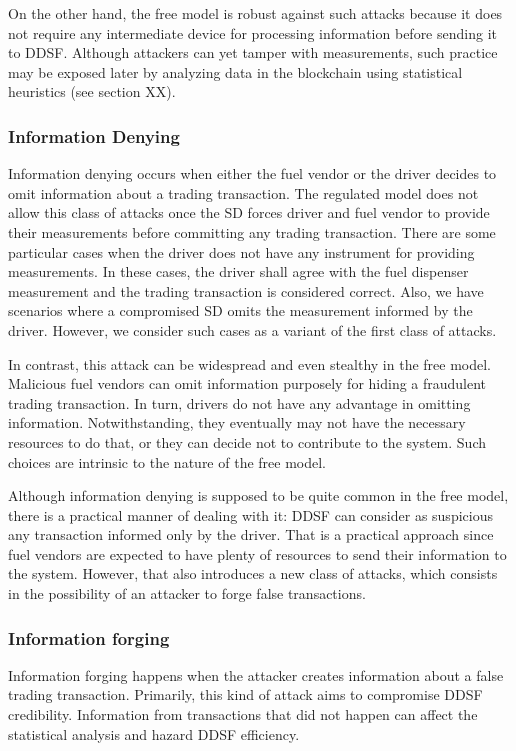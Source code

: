 \documentclass[sigplan]{acmart}
\begin{document}
On the other hand, the free model is robust against such attacks because it does not require any intermediate device for processing information before sending it to DDSF.
Although attackers can yet tamper with measurements, such practice may be exposed later by analyzing data in the blockchain using statistical heuristics (see section XX).

\subsubsection{Information Denying}
Information denying occurs when either the fuel vendor or the driver decides to omit information about a trading transaction.
The regulated model does not allow this class of attacks once the SD forces driver and fuel vendor to provide their measurements before committing any trading transaction.
There are some particular cases when the driver does not have any instrument for providing measurements.
In these cases, the driver shall agree with the fuel dispenser measurement and the trading transaction is considered correct.
Also, we have scenarios where a compromised SD omits the measurement informed by the driver.
However, we consider such cases as a variant of the first class of attacks.

In contrast, this attack can be widespread and even stealthy in the free model.
Malicious fuel vendors can omit information purposely for hiding a fraudulent trading transaction.
In turn, drivers do not have any advantage in omitting information.
Notwithstanding,  they eventually may not have the necessary resources to do that, or they can decide not to contribute to the system.
Such choices are intrinsic to the nature of the free model.

Although information denying is supposed to be quite common in the free model, there is a practical manner of dealing with it: DDSF can consider as suspicious any transaction informed only by the driver.
That is a practical approach since fuel vendors are expected to have plenty of resources to send their information to the system.
However, that also introduces a new class of attacks, which consists in the possibility of an attacker to forge false transactions.

\subsubsection{Information forging}
Information forging happens when the attacker creates information about a false trading transaction.
Primarily, this kind of attack aims to compromise DDSF credibility.
Information from transactions that did not happen can affect the statistical analysis and hazard DDSF efficiency.
\end{document}
